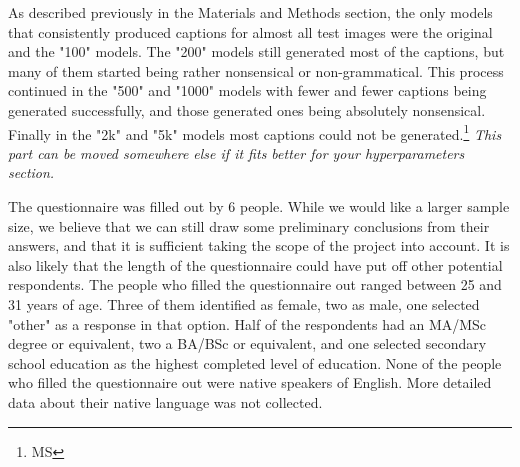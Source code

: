 \documentclass[11pt]{article}
\begin{document}
As described previously in the Materials and Methods section, the only models that consistently produced captions for almost all test images were the original and the "100" models. The "200" models still generated most of the captions, but many of them started being rather nonsensical or non-grammatical. This process continued in the "500" and "1000" models with fewer and fewer captions being generated successfully, and those generated ones being absolutely nonsensical. Finally in the "2k" and "5k" models most captions could not be generated.\footnote{MS} \textit{This part can be moved somewhere else if it fits better for your hyperparameters section.}

The questionnaire was filled out by 6 people. While we would like a larger sample size, we believe that we can still draw some preliminary conclusions from their answers, and that it is sufficient taking the scope of the project into account. It is also likely that the length of the questionnaire could have put off other potential respondents. The people who filled the questionnaire out ranged between 25 and 31 years of age. Three of them identified as female, two as male, one selected "other" as a response in that option. Half of the respondents had an MA/MSc degree or equivalent, two a BA/BSc or equivalent, and one selected secondary school education as the highest completed level of education. None of the people who filled the questionnaire out were native speakers of English. More detailed data about their native language was not collected. 
\end{document}
